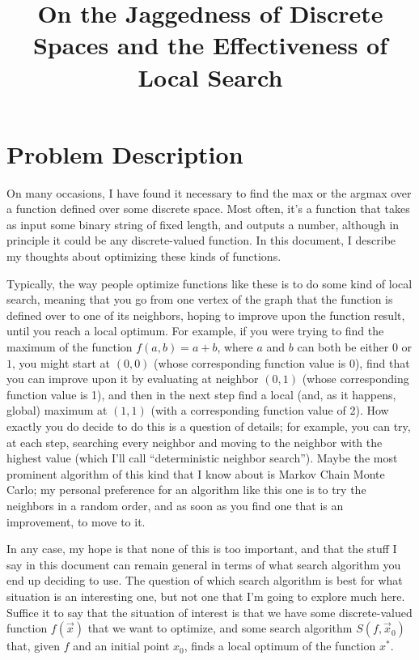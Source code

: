 \documentclass[11pt]{article}
\title{On the Jaggedness of Discrete Spaces and the Effectiveness of Local Search}
\begin{document}
\maketitle

\section{Problem Description}

On many occasions, I have found it necessary to find the max or the argmax over a function defined over some discrete space. Most often, it's a function that takes as input some binary string of fixed length, and outputs a number, although in principle it could be any discrete-valued function. In this document, I describe my thoughts about optimizing these kinds of functions.

Typically, the way people optimize functions like these is to do some kind of local search, meaning that you go from one vertex of the graph that the function is defined over to one of its neighbors, hoping to improve upon the function result, until you reach a local optimum. For example, if you were trying to find the maximum of the function $f(a,b) = a + b$, where $a$ and $b$ can both be either $0$ or $1$, you might start at $(0,0)$ (whose corresponding function value is 0), find that you can improve upon it by evaluating at neighbor $(0,1)$ (whose corresponding function value is 1), and then in the next step find a local (and, as it happens, global) maximum at $(1,1)$ (with a corresponding function value of 2). How exactly you do decide to do this is a question of details; for example, you can try, at each step, searching every neighbor and moving to the neighbor with the highest value (which I'll call ``deterministic neighbor search''). Maybe the most prominent algorithm of this kind that I know about is Markov Chain Monte Carlo; my personal preference for an algorithm like this one is to try the neighbors in a random order, and as soon as you find one that is an improvement, to move to it\footnotemark. 

In any case, my hope is that none of this is too important, and that the stuff I say in this document can remain general in terms of what search algorithm you end up deciding to use. The question of which search algorithm is best for what situation is an interesting one, but not one that I'm going to explore much here. Suffice it to say that the situation of interest is that we have some discrete-valued function $f(\vec{x})$ that we want to optimize, and some search algorithm $S(f, \vec{x}_0)$ that, given $f$ and an initial point $x_0$, finds a local optimum of the function $x^*$. 
\end{document}
